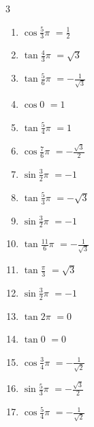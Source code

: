 \begin{multicols}{3}
\begin{enumerate}
  \item $\displaystyle \cos{\frac{5}{3}\pi}$
        $\displaystyle =\frac{1}{2}$

  \item $\displaystyle \tan{\frac{4}{3}\pi}$
        $\displaystyle =\sqrt{3}$

  \item $\displaystyle \tan{\frac{5}{6}\pi}$
        $\displaystyle =-\frac{1}{\sqrt{3}}$

  \item $\displaystyle \cos{0}$
        $\displaystyle =1$

  \item $\displaystyle \tan{\frac{5}{4}\pi}$
        $\displaystyle =1$

  \item $\displaystyle \cos{\frac{7}{6}\pi}$
        $\displaystyle =-\frac{\sqrt{3}}{2}$

  \item $\displaystyle \sin{\frac{3}{2}\pi}$
        $\displaystyle =-1$

  \item $\displaystyle \tan{\frac{5}{3}\pi}$
        $\displaystyle =-\sqrt{3}$

  \item $\displaystyle \sin{\frac{3}{2}\pi}$
        $\displaystyle =-1$

  \item $\displaystyle \tan{\frac{11}{6}\pi}$
        $\displaystyle =-\frac{1}{\sqrt{3}}$

  \item $\displaystyle \tan{\frac{\pi}{3}}$
        $\displaystyle =\sqrt{3}$

  \item $\displaystyle \sin{\frac{3}{2}\pi}$
        $\displaystyle =-1$

  \item $\displaystyle \tan{2\pi}$
        $\displaystyle =0$

  \item $\displaystyle \tan{0}$
        $\displaystyle =0$

  \item $\displaystyle \cos{\frac{3}{4}\pi}$
        $\displaystyle =-\frac{1}{\sqrt{2}}$

  \item $\displaystyle \sin{\frac{5}{3}\pi}$
        $\displaystyle =-\frac{\sqrt{3}}{2}$

\columnbreak %

  \item $\displaystyle \cos{\frac{5}{4}\pi}$
        $\displaystyle =-\frac{1}{\sqrt{2}}$


\end{enumerate}
\end{multicols}
